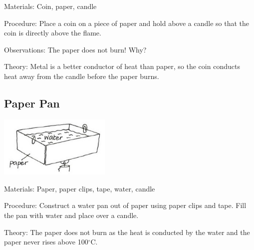 \begin{multicols}{2}
\begin{description*}
\item[Materials:]{Coin, paper, candle}
\item[Procedure:]{Place a coin on a piece of paper and hold above a candle so that the coin is directly above the flame.}
\item[Observations:]{The paper does not burn! Why?}
\item[Theory:]{Metal is a better conductor of heat than paper, so the coin conducts heat away from the candle before the paper burns.}
\end{description*}

\subsection{Paper Pan}

\begin{center}
\includegraphics[width=0.4\textwidth]{./img/vso/paper-pan.jpg}
\end{center}

\begin{description*}
\item[Materials:]{Paper, paper clips, tape, water, candle}
\item[Procedure:]{Construct a water pan out of paper using paper clips and tape. Fill the pan with water and place over a candle.}
\item[Theory:]{The paper does not burn as the heat is conducted by the water and the paper never rises above 100$^\circ$C.}
\end{description*}


\end{multicols}
